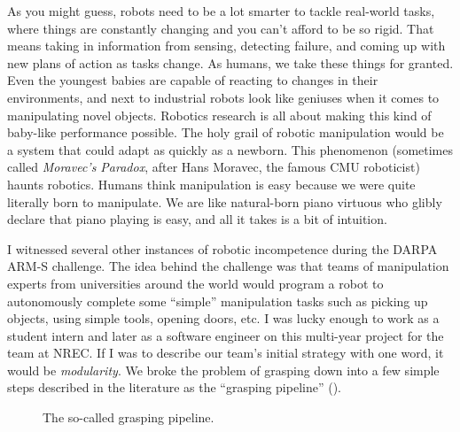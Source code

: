 As you might guess, robots need to be a lot smarter to tackle real-world tasks, where things are constantly changing and you can't afford to be so rigid. That means taking in information from sensing, detecting failure, and coming up with new plans of action as tasks change. As humans, we take these things for granted. Even the youngest babies are capable of reacting to changes in their environments, and next to industrial robots look like geniuses when it comes to manipulating novel objects. Robotics research is all about making this kind of baby-like performance possible. The holy grail of robotic manipulation would be a system that could adapt as quickly as a newborn. This phenomenon (sometimes called \textit{Moravec's Paradox}, after Hans Moravec, the famous CMU roboticist) haunts robotics. Humans think manipulation is easy because we were quite literally born to manipulate. We are like natural-born piano virtuous who glibly declare that piano playing is easy, and all it takes is a bit of intuition.

I witnessed several other instances of robotic incompetence during the DARPA ARM-S challenge. The idea behind the challenge was that teams of manipulation experts from universities around the world would program a robot to autonomously complete some ``simple'' manipulation tasks such as picking up objects, using simple tools, opening doors, etc. I was lucky enough to work as a student intern and later as a software engineer on this multi-year project for the team at NREC. If I was to describe our team's initial strategy with one word, it would be \textit{modularity}. We broke the problem of grasping down into a few simple steps described in the literature as the ``grasping pipeline'' ().

\begin{figure}
\centering
\caption{The so-called grasping pipeline.}
\label{fig:grasp_pipeline}
\end{figure}

